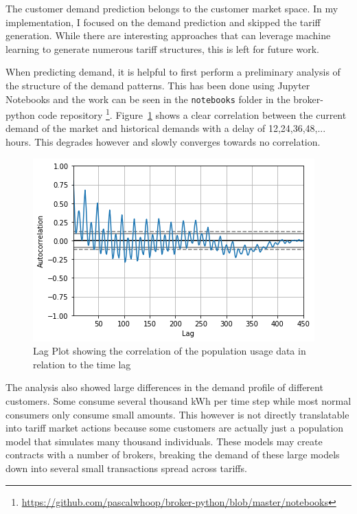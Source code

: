 The customer demand prediction belongs to the customer market space. In my implementation, I focused on the demand
prediction and skipped the tariff generation. While there are interesting approaches that can leverage machine learning
to generate numerous tariff structures, this is left for future work. 

When predicting demand, it is helpful to first perform a preliminary analysis of the structure of the demand patterns.
This has been done using Jupyter Notebooks and the work can be seen in the \texttt{notebooks} folder in the
broker-python code repository
\footnote{\url{https://github.com/pascalwhoop/broker-python/blob/master/notebooks}}.
Figure~\ref{fig:demandtimelag} shows a clear correlation between the current demand of the market and historical demands with a
delay of 12,24,36,48,... hours. This degrades however and slowly converges towards no correlation.

\begin{figure}[]
    \centering
    \includegraphics[width=0.6\linewidth]{img/demand_6.png}
    \caption{Lag Plot showing the correlation of the population usage data in relation to the time lag}
    \label{fig:demandtimelag}
\end{figure}

The analysis also showed large differences in the demand profile of different customers. Some consume several thousand
\ac {kWh} per time step while most normal consumers only consume small amounts. This however is not directly
translatable into tariff market actions because some customers are actually just a population model that simulates many
thousand individuals. These models may create contracts with a number of brokers, breaking the demand of these large
models down into several small transactions spread across tariffs.

